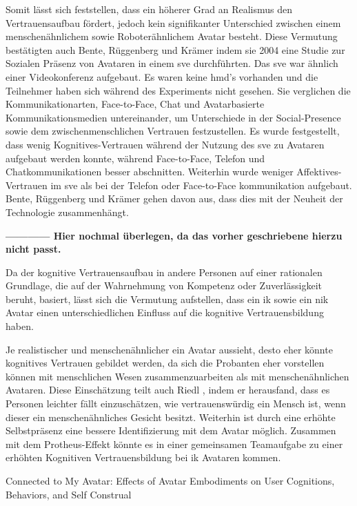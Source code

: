 \documentclass[a4paper,11pt]{article}%
\renewcommand{\\}{\vspace*{0.5\baselineskip} \newline}
\begin{document}
Somit lässt sich feststellen, dass ein höherer Grad an Realismus den Vertrauensaufbau fördert, jedoch kein signifikanter Unterschied zwischen einem menschenähnlichem sowie Roboterähnlichem Avatar besteht. Diese Vermutung bestätigten auch Bente, Rüggenberg und Krämer \citep[p.54-59]{bente2004social} indem sie 2004 eine Studie zur Sozialen Präsenz von Avataren in einem \ac{sve} durchführten. Das \ac{sve} war ähnlich einer Videokonferenz aufgebaut. Es waren keine \ac{hmd}'s vorhanden und die Teilnehmer haben sich während des Experiments nicht gesehen. Sie verglichen die Kommunikationarten, Face-to-Face, Chat und Avatarbasierte Kommunikationsmedien untereinander, um Unterschiede in der Social-Presence sowie dem zwischenmenschlichen Vertrauen festzustellen.
Es wurde festgestellt, dass wenig Kognitives-Vertrauen während der Nutzung des \ac{sve} zu Avataren aufgebaut werden konnte, während Face-to-Face, Telefon und Chatkommunikationen besser abschnitten. Weiterhin wurde weniger Affektives-Vertrauen im \ac{sve} als bei der Telefon oder Face-to-Face kommunikation aufgebaut.
Bente, Rüggenberg und Krämer gehen davon aus, dass dies mit der Neuheit der Technologie zusammenhängt.

\textbf{------------ Hier nochmal überlegen, da das vorher geschriebene hierzu nicht passt. }

Da der kognitive Vertrauensaufbau in andere Personen auf einer rationalen Grundlage, die auf der Wahrnehmung von Kompetenz oder Zuverlässigkeit beruht, basiert, lässt sich die Vermutung aufstellen, dass ein \ac{ik} sowie ein \ac{nik} Avatar einen unterschiedlichen Einfluss auf die kognitive Vertrauensbildung haben.

Je realistischer und menschenähnlicher ein Avatar aussieht, desto eher könnte kognitives Vertrauen gebildet werden, da sich die Probanten eher vorstellen können mit menschlichen Wesen zusammenzuarbeiten als mit menschenähnlichen Avataren. Diese Einschätzung teilt auch Riedl \cite{riedl2014trusting}, indem er herausfand, dass es Personen leichter fällt einzuschätzen, wie vertrauenswürdig ein Mensch ist, wenn dieser ein menschenähnliches Gesicht besitzt.
Weiterhin ist durch eine erhöhte Selbstpräsenz eine bessere Identifizierung mit dem Avatar möglich. Zusammen mit dem Protheus-Effekt könnte es in einer gemeinsamen Teamaufgabe zu einer erhöhten Kognitiven Vertrauensbildung bei \ac{ik} Avataren kommen.

Connected to My Avatar:
Effects of Avatar Embodiments on User Cognitions, Behaviors,
and Self Construal 
%
\end{document}
